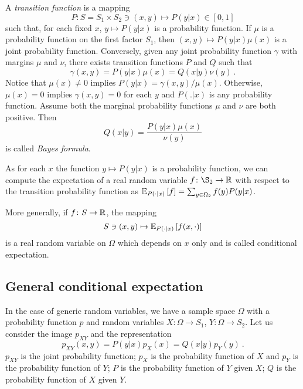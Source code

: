 \documentclass[12pt,a4paper]{amsart}
\theoremstyle{plain}%
\theoremstyle{definition}
\theoremstyle{remark}
\begin{document}
A \emph{transition function} is a mapping
\begin{equation*}
  P \colon S = S_1 \times S_2 \ni (x,y) \mapsto P(y|x) \in [0,1]
\end{equation*}
such that, for each fixed $x$, $y \mapsto P(y|x)$ is a probability function. If $\mu$ is a probability function on the first factor $S_1$, then $(x,y) \mapsto P(y|x)\mu(x)$  is a joint probability function. Conversely, given any joint probability function $\gamma$ with margins $\mu$ and $\nu$, there exists transition functions $P$ and $Q$ such that
\begin{equation*}
  \gamma(x,y) = P(y|x)\mu(x) = Q(x|y)\nu(y) \ .
\end{equation*}
Notice that $\mu(x) \neq 0$ implies $P(y|x) = \gamma(x,y)/\mu(x)$. Otherwise, $\mu(x)=0$ implies $\gamma(x,y) = 0$ for each $y$ and $P(.|x)$ is any probability function. Assume both the marginal probability functions $\mu$ and $\nu$ are both positive. Then
\begin{equation*}
  Q(x|y) = \frac {P(y|x)\mu(x)}{\nu(y)}
\end{equation*}
is called \emph{Bayes formula}.

As for each $x$ the function $y \mapsto P(y|x)$ is a probability
function, we can compute the expectation of a real random variable $f
\colon \S_2 \to \reals$ with respect to the transition probability
function as $\operatorname{\mathbb E}_{P(\cdot|x)}\left[f\right] = \sum_{y\in\Omega_2} f(y)
P(y|x)$.

More generally, if $f \colon S \to \mathbb{R}$, the mapping
\begin{equation*}
  S \ni (x,y) \mapsto \operatorname{\mathbb E}_{P(\cdot|x)}\left[f(x,\cdot)\right] 
\end{equation*}
is a real random variable on $\Omega$ which depends on $x$ only and is
called conditional expectation.

\subsection{General conditional expectation}
\label{sec:condexp}

In the case of generic random variables, we have a sample space $\Omega$ with a probability function $p$ and random variables $X \colon \Omega \to S_1$, $Y \colon \Omega \to S_2$. Let us consider the image $p_{XY}$ and the representation
\begin{equation*}
  p_{XY}(x,y) = P(y|x)p_X(x) = Q(x|y) p_Y(y) \ .
\end{equation*}
$p_{XY}$ is the joint probability function; $p_X$ is the probability function of $X$ and $p_Y$ is the probability function of $Y$; $P$ is the probability function of $Y$ given $X$; $Q$ is the probability function of $X$ given $Y$.
\end{document}
